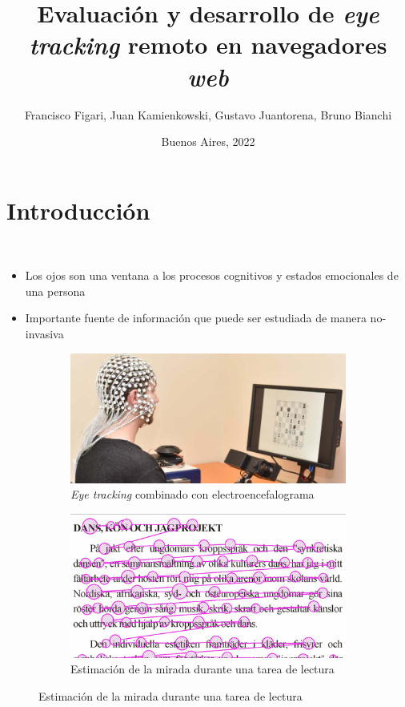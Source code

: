 \documentclass[aspectratio=169]{beamer}
\title{Evaluación y desarrollo de \textit{eye tracking} remoto en navegadores
\textit{web}}
\author{Francisco Figari, Juan Kamienkowski, Gustavo Juantorena, Bruno Bianchi}
\date{Buenos Aires, 2022}
\begin{document}
\frame{\titlepage}

\section{Introducción}

\begin{frame}{~}

  \begin{itemize}
      \item Los ojos son una ventana a los procesos cognitivos y estados
        emocionales de una persona
      \item Importante fuente de información que puede ser estudiada de manera
        no-invasiva
  \end{itemize}

  \begin{figure}
    \begin{subfigure}{0.49\textwidth}
      \centering
      \includegraphics[width=\linewidth]{img/eye-link-eeg.jpg}
      \caption{\textit{Eye tracking} combinado con electroencefalograma}
    \end{subfigure}
    \begin{subfigure}{0.49\textwidth}
      \centering
      \includegraphics[width=\linewidth]{img/reading-fixations-saccades.jpg}
      \caption{Estimación de la mirada durante una tarea de lectura}
    \end{subfigure}
  \end{figure}

\end{frame}
\end{document}
